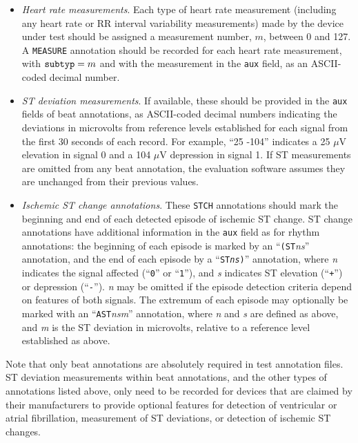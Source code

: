 \begin{itemize}
   \item {\em Heart rate measurements}.  Each type of heart rate measurement
(including any heart rate or RR interval variability measurements) made by the
device under test should be assigned a measurement number, $m$, between 0 and
127.  A {\tt MEASURE} annotation should be recorded for each heart rate
measurement, with ${\tt subtyp} = m$ and with the measurement in the {\tt aux}
field, as an ASCII-coded decimal number.

   \item {\em ST deviation measurements}.  If available, these should be
provided in the {\tt aux} fields of beat annotations, as ASCII-coded decimal
numbers indicating the deviations in microvolts from reference levels
established for each signal from the first 30 seconds of each record.  For
example, ``25 -104'' indicates a 25 $\mu$V elevation in signal 0 and a 104
$\mu$V depression in signal 1.  If ST measurements are omitted from any beat
annotation, the evaluation software assumes they are unchanged from their
previous values.

   \item {\em Ischemic ST change annotations}.  These {\tt STCH} annotations
should mark the beginning and end of each detected episode of ischemic ST
change.  ST change annotations have additional information in the {\tt aux}
field as for rhythm annotations: the beginning of each episode is marked by an
``{\tt (ST}{\it ns}'' annotation, and the end of each episode by a
``{\tt ST{\it ns})}'' annotation, where {\it n} indicates the signal affected
 (``{\tt 0}'' or ``{\tt 1}''), and {\it s} indicates ST elevation (``{\tt +}'')
or depression (``{\tt -}'').  {\it n} may be omitted if the episode detection
criteria depend on features of both signals.  The extremum of each episode may
optionally be marked with an ``{\tt AST}{\it nsm}'' annotation, where {\it n}
and {\it s} are defined as above, and {\it m} is the ST deviation in
microvolts, relative to a reference level established as above.
\end{itemize}
Note that only beat annotations are absolutely required in test annotation
files.  ST deviation measurements within beat annotations, and the other
types of annotations listed above, only need to be recorded for devices
that are claimed by their manufacturers to provide optional features for
detection of ventricular or atrial fibrillation, measurement of ST deviations,
or detection of ischemic ST changes.

